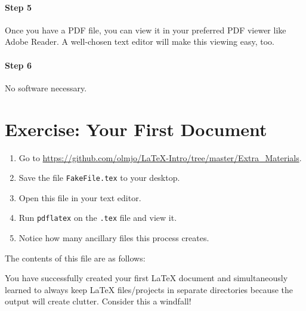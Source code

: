 \paragraph{Step 5} Once you have a PDF file, you can view it in your preferred
PDF viewer like Adobe Reader. A well-chosen text editor will make this viewing
easy, too.

\paragraph{Step 6} No software necessary.

\section{Exercise: Your First Document}

\begin{enumerate}
\item Go to
  \url{https://github.com/olmjo/LaTeX-Intro/tree/master/Extra_Materials}.

\item Save the file \texttt{FakeFile.tex} to your desktop.

\item Open this file in your text editor.

\item Run \texttt{pdflatex} on the \texttt{.tex} file and view it.

\item Notice how many ancillary files this process creates.

\end{enumerate}

The contents of this file are as follows:



You have successfully created your first \LaTeX{} document and
simultaneously learned to always keep \LaTeX{} files/projects in
separate directories because the output will create clutter. Consider
this a windfall!



